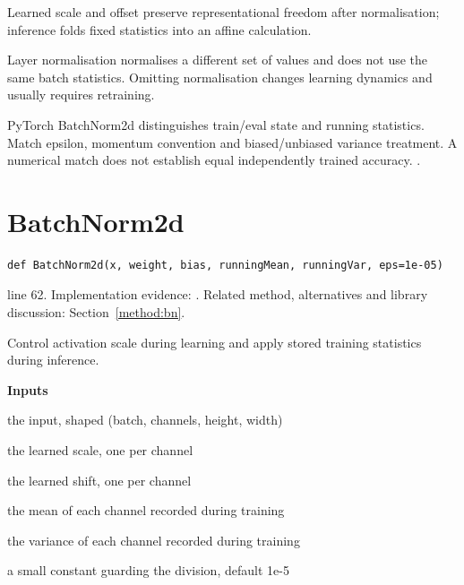 Learned scale and offset preserve representational freedom after normalisation; inference folds fixed statistics into an affine calculation.


Layer normalisation normalises a different set of values and does not use the same batch statistics. Omitting normalisation changes learning dynamics and usually requires retraining.


PyTorch BatchNorm2d distinguishes train/eval state and running statistics. Match epsilon, momentum convention and biased/unbiased variance treatment. A numerical match does not establish equal independently trained accuracy. \cite{ioffe2015,torchbn}.


\section{BatchNorm2d}\label{fn:recognise:BatchNorm2d}
\begin{lstlisting}[style=sig]
def BatchNorm2d(x, weight, bias, runningMean, runningVar, eps=1e-05)
\end{lstlisting}
 line 62. Implementation evidence: \cite{code2026}. Related method, alternatives and library discussion: Section~\ref{method:bn}.


Control activation scale during learning and apply stored training statistics during inference.




\noindent\textbf{Inputs}
\begin{description}[leftmargin=2.2em,style=nextline,font=\normalfont\ttfamily]\setlength\itemsep{1pt}
  \item[{x}] \normalfont the input, shaped (batch, channels, height, width)
  \item[{weight}] \normalfont the learned scale, one per channel
  \item[{bias}] \normalfont the learned shift, one per channel
  \item[{runningMean}] \normalfont the mean of each channel recorded during training
  \item[{runningVar}] \normalfont the variance of each channel recorded during training
  \item[{eps}] \normalfont a small constant guarding the division, default 1e-5
\end{description}

